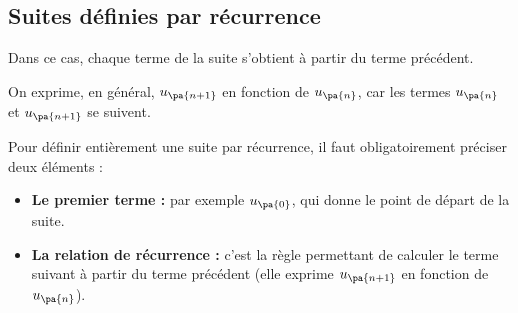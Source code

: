 \subsection{Suites définies par récurrence}

\begin{definition}
	Dans ce cas, chaque terme de la suite s'obtient à partir du terme précédent.

	On exprime, en général, $u_{\pa{n+1}}$ en fonction de $u_{\pa{n}}$, car les termes $u_{\pa{n}}$ et $u_{\pa{n+1}}$ se suivent.

	Pour définir entièrement une suite par récurrence, il faut obligatoirement préciser deux éléments :

	\begin{itemize}
		\item \textbf{Le premier terme : } par exemple $u_{\pa{0}}$, qui donne le point de départ de la suite.
		\item \textbf{La relation de récurrence : } c'est la \og règle \fg{} permettant de calculer le terme suivant à partir du terme précédent (elle exprime $u_{\pa{n+1}}$ en fonction de $u_{\pa{n}}$).
	\end{itemize}
\end{definition}

